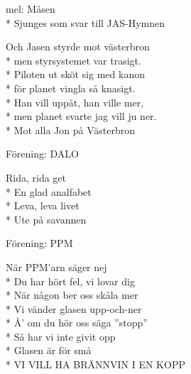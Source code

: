 \begin{SongText}[JASen]
    \begin{SongInfo}
        mel: Måsen\\*%
        Sjunges som svar till JAS-Hymnen
    \end{SongInfo}
    \begin{Verse}
        Och Jasen styrde mot västerbron\\*%
        men styrsystemet var trasigt.\\*%
        Piloten ut sköt sig med kanon\\*%
        för planet vingla så knasigt.\\*%
        Han vill uppåt, han ville mer,\\*%
        men planet svarte jag vill ju ner.\\*%
        Mot alla Jon på Västerbron
    \end{Verse}
\end{SongText}

\begin{SongText}
    \begin{SongInfo}
        Förening: DALO
    \end{SongInfo}
    \begin{Verse}
        Rida, rida get\\*%
        En glad analfabet\\*%
        Leva, leva livet\\*%
        Ute på savannen
    \end{Verse}
\end{SongText}

\begin{SongText} 
    \begin{SongInfo}
        Förening: PPM
    \end{SongInfo}
    \begin{Verse}
        När PPM’arn säger nej\\*%
        Du har hört fel, vi lovar dig\\*%
        När någon ber oss skåla mer\\*%
        Vi vänder glasen upp-och-ner\\*%
        Å’ om du hör oss säga ”stopp”\\*%
        Så har vi inte givit opp\\*%
        Glasen är för små\\*%
        VI VILL HA BRÄNNVIN I EN KOPP
    \end{Verse}
\end{SongText}

